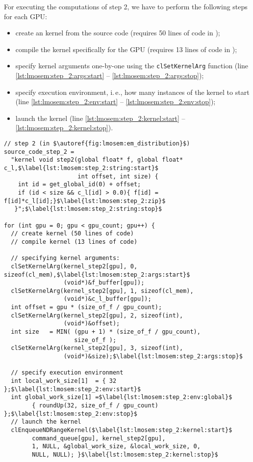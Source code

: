 For executing the computations of step 2, we have to perform the following steps for each GPU:
\begin{itemize}
  \item create an \OpenCL kernel from the source code (requires 50 lines of code in \OpenCL);
  \item compile the kernel specifically for the GPU (requires 13 lines of code in \OpenCL);
  \item specify kernel arguments one-by-one using the \texttt{clSetKernelArg} function (line \autoref{lst:lmosem:step_2:args:start} -- \autoref{lst:lmosem:step_2:args:stop});
  \item specify execution environment, i.\,e., how many instances of the kernel to start (line \autoref{lst:lmosem:step_2:env:start} -- \autoref{lst:lmosem:step_2:env:stop});
  \item launch the kernel (line \autoref{lst:lmosem:step_2:kernel:start} -- \autoref{lst:lmosem:step_2:kernel:stop}).
\end{itemize}
\begin{lstlisting}[float,
  caption={Implementation of step 2 in \OpenCL (omitting error checks for brevity)},
  label={lst:lmosem:step_2}]
// step 2 (in $\autoref{fig:lmosem:em_distribution}$)
source_code_step_2 =
  "kernel void step2(global float* f, global float* c_l,$\label{lst:lmosem:step_2:string:start}$
                     int offset, int size) {
    int id = get_global_id(0) + offset;
    if (id < size && c_l[id] > 0.0){ f[id] = f[id]*c_l[id];}$\label{lst:lmosem:step_2:zip}$
   }";$\label{lst:lmosem:step_2:string:stop}$

for (int gpu = 0; gpu < gpu_count; gpu++) {
  // create kernel (50 lines of code)
  // compile kernel (13 lines of code)

  // specifying kernel arguments:
  clSetKernelArg(kernel_step2[gpu], 0, sizeof(cl_mem),$\label{lst:lmosem:step_2:args:start}$
                 (void*)&f_buffer[gpu]);
  clSetKernelArg(kernel_step2[gpu], 1, sizeof(cl_mem),
                 (void*)&c_l_buffer[gpu]);
  int offset = gpu * (size_of_f / gpu_count);
  clSetKernelArg(kernel_step2[gpu], 2, sizeof(int),
                 (void*)&offset);
  int size   = MIN( (gpu + 1) * (size_of_f / gpu_count),
                    size_of_f );
  clSetKernelArg(kernel_step2[gpu], 3, sizeof(int),
                 (void*)&size);$\label{lst:lmosem:step_2:args:stop}$

  // specify execution environment
  int local_work_size[1]  = { 32 };$\label{lst:lmosem:step_2:env:start}$
  int global_work_size[1] =$\label{lst:lmosem:step_2:env:global}$
        { roundUp(32, size_of_f / gpu_count) };$\label{lst:lmosem:step_2:env:stop}$
  // launch the kernel
  clEnqueueNDRangeKernel($\label{lst:lmosem:step_2:kernel:start}$
        command_queue[gpu], kernel_step2[gpu],
        1, NULL, &global_work_size, &local_work_size, 0,
        NULL, NULL); }$\label{lst:lmosem:step_2:kernel:stop}$
\end{lstlisting}


